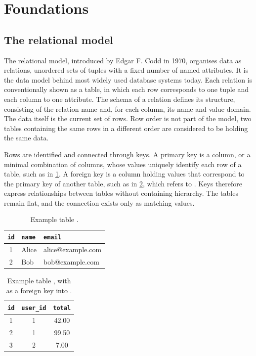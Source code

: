 
\section{Foundations}

\subsection{The relational model}
\label{sec:relational-model}

The relational model, introduced by Edgar F. Codd in 1970\autocite{codd1970},
organises data as relations,
unordered sets of tuples with a fixed number of named attributes.
It is the data model behind most widely used database systems today.
Each relation is conventionally shown as a table,
in which each row corresponds to one tuple and each column to one attribute.
The schema of a relation defines its structure,
consisting of the relation name and, for each column, its name and value domain.
The data itself is the current set of rows.
Row order is not part of the model,
two tables containing the same rows in a different order
are considered to be holding the same data.

Rows are identified and connected through keys.
A primary key is a column, or a minimal combination of columns,
whose values uniquely identify each row of a table,
such as  in \cref{tab:users}.
A foreign key is a column holding values
that correspond to the primary key of another table,
such as  in \cref{tab:orders},
which refers to .
Keys therefore express relationships between tables without containing hierarchy.
The tables remain flat, and the connection exists only as matching values.

\begin{table}[H]
	\centering
	\begin{tabular}{|c|l|l|}
		\hline
		\texttt{id}            & \texttt{name} & \texttt{email}    \\
		\hline
		\textcolor{pink700}{1} & Alice         & alice@example.com \\
		\textcolor{blue700}{2} & Bob           & bob@example.com   \\
		\hline
	\end{tabular}
	\caption{Example table .}
	\label{tab:users}
\end{table}

\begin{table}[H]
	\centering
	\begin{tabular}{|c|c|c|}
		\hline
		\texttt{id} & \texttt{user\_id}      & \texttt{total} \\
		\hline
		1           & \textcolor{pink700}{1} & 42.00          \\
		2           & \textcolor{pink700}{1} & 99.50          \\
		3           & \textcolor{blue700}{2} & 7.00           \\
		\hline
	\end{tabular}
	\caption{Example table , with  as a foreign key into .}
	\label{tab:orders}
\end{table}


